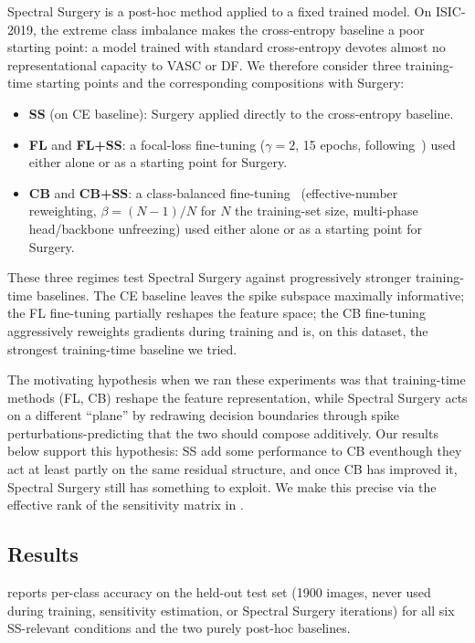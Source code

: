 \documentclass[11pt,a4paper]{article}
\begin{document}
Spectral Surgery is a post-hoc method applied to a fixed trained model.
On ISIC-2019, the extreme class imbalance makes the cross-entropy
baseline a poor starting point: a model trained with standard
cross-entropy devotes almost no representational capacity to VASC or
DF. We therefore consider three training-time starting points and the
corresponding compositions with Surgery:
\begin{itemize}
    \item \textbf{SS} (on CE baseline): Surgery applied directly to the
      cross-entropy baseline.
    \item \textbf{FL} and \textbf{FL+SS}: a focal-loss fine-tuning
      ($\gamma = 2$, 15 epochs,
      following~\cite{lin2017}) used either alone or as a starting
      point for Surgery.
    \item \textbf{CB} and \textbf{CB+SS}: a class-balanced
      fine-tuning~\cite{cui2019} (effective-number reweighting,
      $\beta = (N-1)/N$ for $N$ the training-set size,
      multi-phase head/backbone unfreezing) used
      either alone or as a starting point for Surgery.
\end{itemize}

These three regimes test Spectral Surgery against progressively stronger
training-time baselines. The CE baseline leaves the spike subspace
maximally informative; the FL fine-tuning partially reshapes the
feature space; the CB fine-tuning aggressively reweights gradients
during training and is, on this dataset, the strongest
training-time baseline we tried.

The motivating hypothesis when we ran these experiments was that
training-time methods (FL, CB) reshape the feature representation,
while Spectral Surgery acts on a different ``plane'' by redrawing decision
boundaries through spike perturbations-predicting that the two
should compose additively. Our results below support this
hypothesis: SS add some performance to CB eventhough they act at least partly on the same residual structure, and once CB 
has improved it, Spectral Surgery still has something to exploit. We make this
precise via the effective rank of the sensitivity matrix in
.

\subsection{Results}

 reports per-class accuracy on the held-out
test set (1900 images, never used during training, sensitivity
estimation, or Spectral Surgery iterations) for all six SS-relevant
conditions and the two purely post-hoc baselines.
\end{document}
